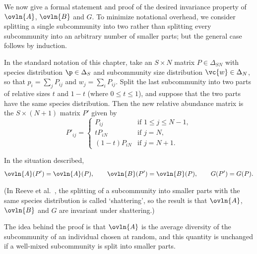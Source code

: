 We now give a formal statement and proof of the desired invariance property
of $\ovln{A}$, $\ovln{B}$ and $G$.  To minimize notational overhead, we
consider splitting a single subcommunity into two rather than splitting
every subcommunity into an arbitrary number of smaller parts; but the
general case follows by induction.

In the standard notation of this chapter, take an $S \times N$ matrix $P
\in \Delta_{SN}$ with species distribution $\p \in \Delta_S$ and
subcommunity size distribution $\vc{w} \in \Delta_N$, so that $p_i = \sum_j
P_{ij}$ and $w_j = \sum_i P_{ij}$.  Split the last subcommunity into two
parts of relative sizes $t$ and $1 - t$ (where $0 \leq t \leq 1$), and
suppose that the two parts have the same species distribution.  Then the
new relative abundance matrix is the $S \times (N + 1)$ matrix $P'$ given
by
\[
P'_{ij}
=
\begin{cases}
P_{ij}  &\text{if } 1 \leq j \leq N - 1,\\
tP_{iN} &\text{if } j = N,      \\
(1 - t)P_{iN}   &\text{if } j = N + 1.
\end{cases}
\]

\begin{propn}
%
%
% 
In the situation described,
\[
\ovln{A}(P') = \ovln{A}(P),
\qquad
\ovln{B}(P') = \ovln{B}(P),
\qquad
G(P') = G(P).
\]
\end{propn}

(In Reeve et al.~\cite{HPD}, the splitting of a subcommunity into smaller
parts with the same species distribution is called `shattering',%
%
%
so the result is that $\ovln{A}$, $\ovln{B}$ and $G$ are invariant under
shattering.)

The idea behind the proof is that $\ovln{A}$ is the average diversity of
the subcommunity of an individual chosen at random, and this quantity is
unchanged if a well-mixed subcommunity is split into smaller parts.

